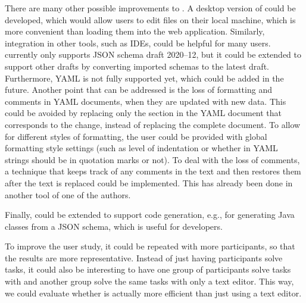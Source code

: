 There are many other possible improvements to \toolname{}.
A desktop version of \toolname{} could be developed, which would allow users to
edit files on their local machine, which is more convenient than loading them into the web application.
Similarly, integration in other tools, such as IDEs, could be helpful for many users.
\toolname{} currently only supports JSON schema draft 2020--12, but it could be extended to support
other drafts by converting imported schemas to the latest draft.
Furthermore, YAML is not fully supported yet, which could be added in the future.
Another point that can be addressed is the loss of formatting and comments in YAML documents, when they are updated with new data.
This could be avoided by replacing only the section in the YAML document that corresponds to the change, instead of replacing the complete document.
To allow for different styles of formatting, the user could be provided with global formatting style settings (such as level of indentation or whether in YAML strings should be in quotation marks or not).
To deal with the loss of comments, a technique that keeps track of any comments in the text and then restores them after the text is replaced could be implemented. This has already been done in another tool of one of the authors\cite{githubBspEditor}.

Finally, \toolname{} could be extended to support code generation, e.g., for generating
Java classes from a JSON schema, which is useful for developers.

To improve the user study, it could be repeated with more participants,
so that the results are more representative.
Instead of just having participants solve tasks, it could also be interesting to
have one group of participants solve tasks with \toolname{} and another group solve
the same tasks with only a text editor.
This way, we could evaluate whether \toolname{} is actually more efficient than
just using a text editor.

